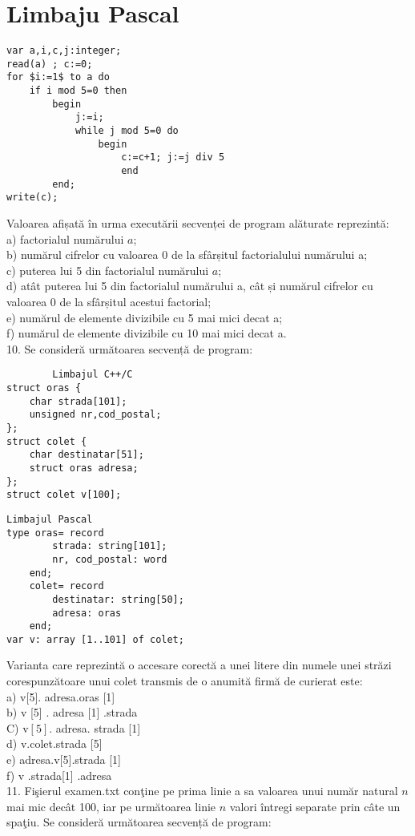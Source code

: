 \section*{Limbaju Pascal}
\begin{verbatim}
var a,i,c,j:integer;
read(a) ; c:=0;
for $i:=1$ to a do
    if i mod 5=0 then
        begin
            j:=i;
            while j mod 5=0 do
                begin
                    c:=c+1; j:=j div 5
                    end
        end;
write(c);
\end{verbatim}

Valoarea afișată în urma executării secvenței de program alăturate reprezintă:\\
a) factorialul numărului $a$;\\
b) numărul cifrelor cu valoarea 0 de la sfârșitul factorialului numărului a;\\
c) puterea lui 5 din factorialul numărului $a$;\\
d) atât puterea lui 5 din factorialul numărului a, cât și numărul cifrelor cu valoarea 0 de la sfârșitul acestui factorial;\\
e) numărul de elemente divizibile cu 5 mai mici decat a;\\
f) numărul de elemente divizibile cu 10 mai mici decat a.\\
10. Se consideră următoarea secvență de program:

\begin{verbatim}
        Limbajul C++/C
struct oras {
    char strada[101];
    unsigned nr,cod_postal;
};
struct colet {
    char destinatar[51];
    struct oras adresa;
};
struct colet v[100];
\end{verbatim}

\begin{verbatim}
Limbajul Pascal
type oras= record
        strada: string[101];
        nr, cod_postal: word
    end;
    colet= record
        destinatar: string[50];
        adresa: oras
    end;
var v: array [1..101] of colet;
\end{verbatim}

Varianta care reprezintă o accesare corectă a unei litere din numele unei străzi corespunzătoare unui colet transmis de o anumită firmă de curierat este:\\[0pt]
a) v[5]. adresa.oras [1]\\[0pt]
b) v [5] . adresa [1] .strada\\
C) $\mathrm{v}[5]$. adresa. strada [1]\\[0pt]
d) v.colet.strada [5]\\[0pt]
e) adresa.v[5].strada [1]\\[0pt]
f) v .strada[1] .adresa\\
11. Fişierul examen.txt conţine pe prima linie a sa valoarea unui număr natural $n$ mai mic decât 100, iar pe următoarea linie $n$ valori întregi separate prin câte un spaţiu. Se consideră următoarea secvență de program:

